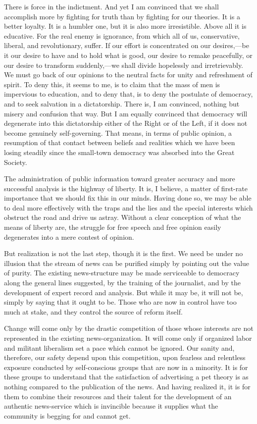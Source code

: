 \documentclass[openany,nobib,nohyper]{tufte-book}
\begin{document}
There is force in the indictment. And yet I am convinced that we shall
accomplish more by fighting for truth than by fighting for our theories.
It is a better loyalty. It is a humbler one, but it is also more
irresistible. Above all it is educative. For the real enemy is
ignorance, from which all of us, conservative, liberal, and
revolutionary, suffer. If our effort is concentrated on our
desires,---be it our desire to have and to hold what is good, our desire
to remake peacefully, or our desire to transform suddenly,---we shall
divide hopelessly and irretrievably. We must go back of our opinions to
the neutral facts for unity and refreshment of spirit. To deny this, it
seems to me, is to claim that the mass of men is impervious to
education, and to deny that, is to deny the postulate of democracy, and
to seek salvation in a dictatorship. There is, I am convinced, nothing
but misery and confusion that way. But I am equally convinced that
democracy will degenerate into this dictatorship either of the Right or
of the Left, if it does not become genuinely self-governing. That means,
in terms of public opinion, a resumption of that contact between beliefs
and realities which we have been losing steadily since the small-town
democracy was absorbed into the Great Society.

The administration of public information toward greater accuracy and
more successful analysis is the highway of liberty. It is, I believe, a
matter of first-rate importance that we should fix this in our minds.
Having done so, we may be able to deal more effectively with the traps
and the lies and the special interests which obstruct the road and drive
us astray. Without a clear conception of what the means of liberty are,
the struggle for free speech and free opinion easily degenerates into a
mere contest of opinion.

But realization is not the last step, though it is the first. We need be
under no illusion that the stream of news can be purified simply by
pointing out the value of purity. The existing news-structure may be
made serviceable to democracy along the general lines suggested, by the
training of the journalist, and by the development of expert record and
analysis. But while it may be, it will not be, simply by saying that it
ought to be. Those who are now in control have too much at stake, and
they control the source of reform itself.

Change will come only by the drastic competition of those whose
interests are not represented in the existing news-organization. It will
come only if organized labor and militant liberalism set a pace which
cannot be ignored. Our sanity and, therefore, our safety depend upon
this competition, upon fearless and relentless exposure conducted by
self-conscious groups that are now in a minority. It is for these groups
to understand that the satisfaction of advertising a pet theory is as
nothing compared to the publication of the news. And having realized it,
it is for them to combine their resources and their talent for the
development of an authentic news-service which is invincible because it
supplies what the community is begging for and cannot get.
\end{document}
